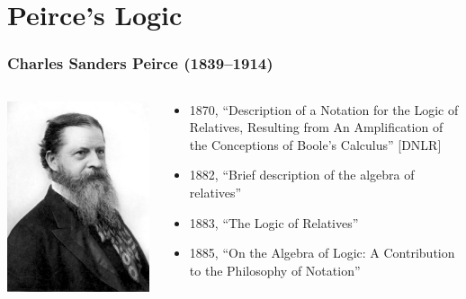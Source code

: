 \documentclass[compress,12pt]{beamer}
\begin{document}
\section{Peirce's Logic}

\begin{frame}
    \frametitle{Charles Sanders Peirce (1839--1914)}

    \begin{columns}
        \begin{column}{0.4\textwidth}
            \begin{center}
                \includegraphics[width=\textwidth]{peirce}
            \end{center}
        \end{column}
        \begin{column}{0.6\textwidth}
            \begin{itemize}
                \item 1870, “Description of a Notation for the Logic of Relatives, Resulting from An Amplification of the Conceptions of Boole’s Calculus” [DNLR]
                \item 1882, “Brief description of the algebra of relatives”
                \item 1883, “The Logic of Relatives”
                \item 1885, “On the Algebra of Logic: A Contribution to the Philosophy of Notation”
            \end{itemize}
        \end{column}
    \end{columns}

\end{frame}
\end{document}
